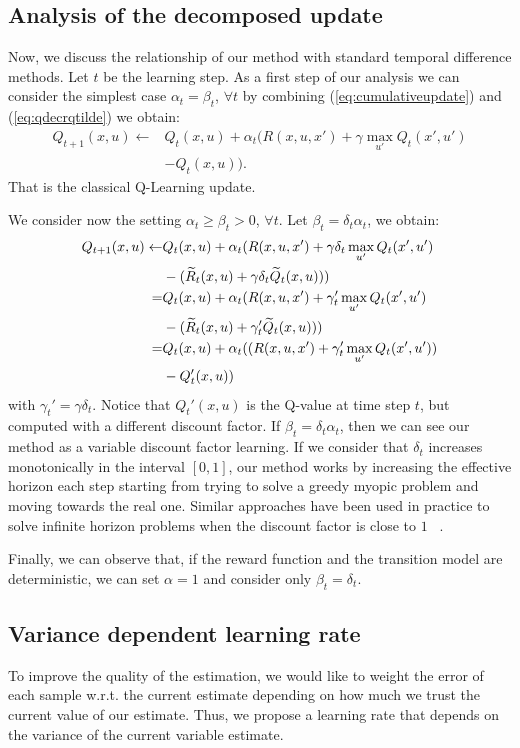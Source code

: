 \documentclass[conference]{IEEEtran}
\begin{document}
\subsection{Analysis of the decomposed update}
Now, we discuss the relationship of our method with standard temporal difference methods. Let $t$ be the learning step. As a first step of our analysis we can consider the simplest case $\alpha_t=\beta_t$, $\forall t$ by combining (\ref{eq:cumulativeupdate}) and (\ref{eq:qdecrqtilde}) we obtain:
\begin{align}
Q_{t+1}(x,u) \leftarrow & Q_t(x,u)+\alpha_t(R(x,u,x')+\gamma\max_{u'}Q_t(x',u')\nonumber\\
 & - Q_t(x,u)).
\end{align}
That is the classical Q-Learning update. 

We consider now the setting $\alpha_t\geq\beta_t>0$, $\forall t$. Let $\beta_t=\delta_t\alpha_t$, we obtain:
\begin{align}
Q_{t+1}(x,u) \leftarrow & Q_t(x,u)+\alpha_t(R(x,u,x')+\gamma\delta_t \max_{u'}Q_t(x',u') \nonumber\\
  & -(\widetilde{R}_t(x,u)+\gamma\delta_t\widetilde{Q}_t(x,u))) \nonumber\\
= & Q_t(x,u)+\alpha_t(R(x,u,x')+\gamma_t'\max_{u'}Q_t(x',u') \nonumber\\
  & -(\widetilde{R}_t(x,u)+\gamma_t'\widetilde{Q}_t(x,u))) \nonumber\\
= & Q_t(x,u)+\alpha_t((R(x,u,x')+\gamma_t'\max_{u'}Q_t(x',u')) \nonumber\\
  & - Q_t'(x,u))
\end{align}
with $\gamma_t'=\gamma\delta_t$. Notice that $Q_t'(x,u)$ is the Q-value at time step $t$, but computed with a different discount factor. If $\beta_t=\delta_t\alpha_t$, then we can see our method as a variable discount factor learning. If we consider that $\delta_t$ increases monotonically in the interval $[0,1]$, our method works by increasing the effective horizon each step starting from trying to solve a greedy myopic problem and moving towards the real one.
Similar approaches have been used in practice to solve infinite horizon problems when the discount factor is close to $1$ ~\cite{crites1996improving, bao2008infinite, franccois2015discount}.

Finally, we can observe that, if the reward function and the transition model are deterministic, we can set $\alpha=1$ and consider only $\beta_t=\delta_t$.

\subsection{Variance dependent learning rate}
To improve the quality of the estimation, we would like to weight the error of each sample w.r.t. the current estimate depending on how much we trust the current value of our estimate. Thus, we propose a learning rate that depends on the variance of the current variable estimate.
\end{document}

